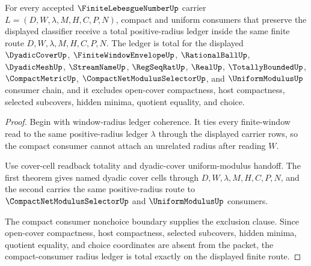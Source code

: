 \begin{theorem}
\label{thm:finite-lebesgue-number-compact-consumer-radius-ledger-totality}
For every accepted $\FiniteLebesgueNumberUp$ carrier $L=(D,W,\lambda,M,H,C,P,N)$, compact and uniform consumers that preserve the displayed classifier receive a total positive-radius ledger inside the same finite route $D,W,\lambda,M,H,C,P,N$. The ledger is total for the displayed $\DyadicCoverUp$, $\FiniteWindowEnvelopeUp$, $\RationalBallUp$, $\DyadicMeshUp$, $\StreamNameUp$, $\RegSeqRatUp$, $\RealUp$, $\TotallyBoundedUp$, $\CompactMetricUp$, $\CompactNetModulusSelectorUp$, and $\UniformModulusUp$ consumer chain, and it excludes open-cover compactness, host compactness, selected subcovers, hidden minima, quotient equality, and choice.
\end{theorem}
\begin{proof}
Begin with window-radius ledger coherence. It ties every finite-window read to the same positive-radius ledger $\lambda$ through the displayed carrier rows, so the compact consumer cannot attach an unrelated radius after reading $W$.

Use cover-cell readback totality and dyadic-cover uniform-modulus handoff. The first theorem gives named dyadic cover cells through $D,W,\lambda,M,H,C,P,N$, and the second carries the same positive-radius route to $\CompactNetModulusSelectorUp$ and $\UniformModulusUp$ consumers.

The compact consumer nonchoice boundary supplies the exclusion clause. Since open-cover compactness, host compactness, selected subcovers, hidden minima, quotient equality, and choice coordinates are absent from the packet, the compact-consumer radius ledger is total exactly on the displayed finite route.
\end{proof}

